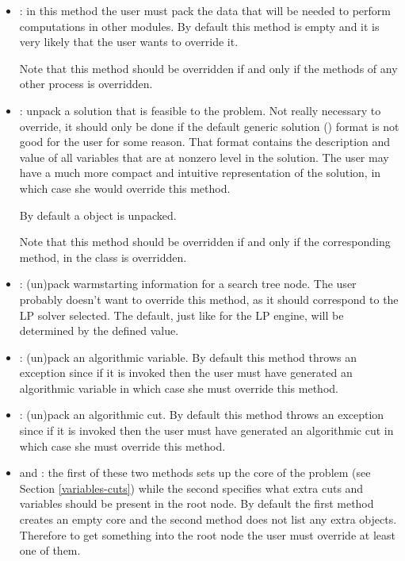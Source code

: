 \begin{itemize}
\item {}: in this method the user must pack the data
  that will be needed to perform computations in other modules. By default
  this method is empty and it is very likely that the user wants to override
  it.

  Note that this method should be overridden if and only if the 
   methods of any other process is overridden.

\item {}: unpack a solution that is feasible
  to 
  the problem. Not really necessary to override, it should only be done if the
  default generic solution () format is not good
  for 
  the user for some reason. That format contains the description and value of
  all variables that are at nonzero level in the solution. The user may have a
  much more compact and intuitive representation of the solution, in which
  case she would override this method.

  By default a  object is unpacked.

  Note that this method should be overridden if and only if the corresponding
  method,  in the class 
  is 
  overridden.
  
\item {}: (un)pack warmstarting information for a
  search tree node. The user probably doesn't want to override this method, as
  it should correspond to the LP solver selected. The default, just like for
  the LP engine, will be determined by the defined  value.

\item {}: (un)pack an algorithmic variable. By
  default this method throws an exception since if it is invoked then the user
  must have generated an algorithmic variable in which case she must override
  this method.

\item {}: (un)pack an algorithmic cut. By
  default this method throws an exception since if it is invoked then the user
  must have generated an algorithmic cut in which case she must override
  this method.

\item {} and : the first of these
  two 
  methods sets up the core of the problem (see Section \ref{variables-cuts})
  while the second specifies what extra cuts and variables should be present
  in the root node. By default the first method creates an empty core and the
  second method does not list any extra objects. Therefore to get something
  into the root node the user must override at least one of them.
  

\end{itemize}
